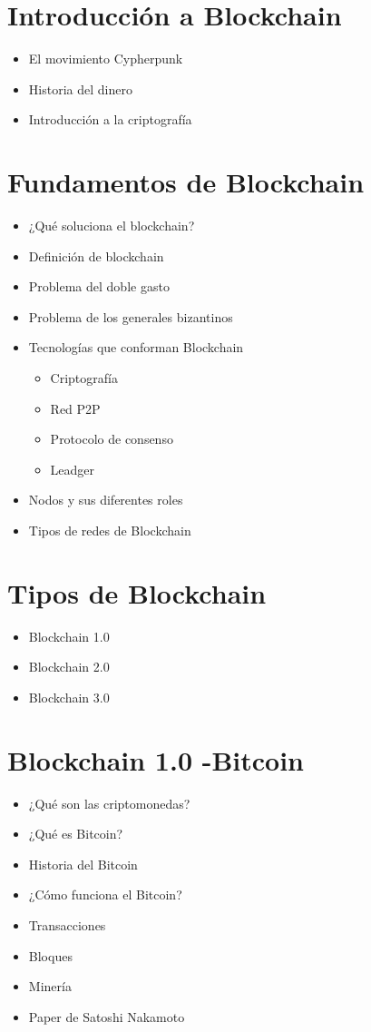 \documentclass{/home/armando/Documentos/Cursos/LaTeX/Plantillas/lib/temarioptc}
\begin{document}
\vspace*{2mm}
\selectfont


\section{Introducción a Blockchain}
\begin{itemize}
	\item El movimiento Cypherpunk
	\item Historia del dinero
	\item Introducción a la criptografía
\end{itemize}
\section{Fundamentos de Blockchain}
\begin{itemize}
	\item ¿Qué soluciona el blockchain?
	\item Definición de blockchain
	\item Problema del doble gasto
	\item Problema de los generales bizantinos
	\item Tecnologías que conforman Blockchain
	\begin{itemize}
		\item Criptografía
		\item Red P2P
		\item Protocolo de consenso
		\item Leadger
	\end{itemize}
	\item Nodos y sus diferentes roles
	\item Tipos de redes de Blockchain
\end{itemize}
\section{Tipos de Blockchain}
\begin{itemize}
	\item Blockchain 1.0
	\item Blockchain 2.0
	\item Blockchain 3.0
\end{itemize}\newpage

\section{Blockchain 1.0 -Bitcoin}
\begin{itemize}
	\item ¿Qué son las criptomonedas?
	\item ¿Qué es Bitcoin?
	\item Historia del Bitcoin
	\item ¿Cómo funciona el Bitcoin?
	\item Transacciones
	\item Bloques
	\item Minería
	\item Paper de Satoshi Nakamoto
\end{itemize}
\end{document}
